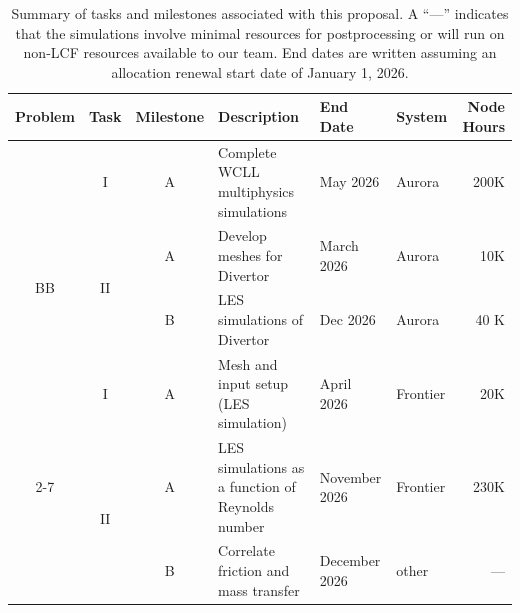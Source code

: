 
\begin{table}[h!]
\footnotesize
\centering
\caption{\small Summary of tasks and milestones associated with this proposal. A ``---'' indicates that the simulations involve minimal resources for postprocessing or will run on non-LCF resources available to our team. End dates are written assuming an allocation renewal start date of January 1, 2026.
}
\begin{tabular}{c c c l l l r}
\toprule
Problem & Task & Milestone & Description & End Date & System & Node Hours\\
\midrule
\multirow{4}{*}{BB} & \multirow{1}{*}{I} & A & Complete WCLL multiphysics simulations & May 2026 & Aurora & 200K \\
\cmidrule{2-7}
& \multirow{2}{*}{II} &A & Develop meshes for Divertor & March 2026 & Aurora & 10K\\
& & B & LES simulations of Divertor & Dec 2026 & Aurora & 40 K\\
\midrule
\multirow{5}{*}{Foam} & \multirow{1}{*}{I} & A & Mesh and input setup (LES simulation) & April 2026 & Frontier & 20K \\\cmidrule{2-7}
& \multirow{2}{*}{II} & A & LES simulations as a function of Reynolds number & November 2026 & Frontier & 230K \\
&  & B & Correlate friction and mass transfer & December 2026 & other & --- \\
\midrule
\bottomrule
\end{tabular}
\label{tab:milestones1}
\end{table}